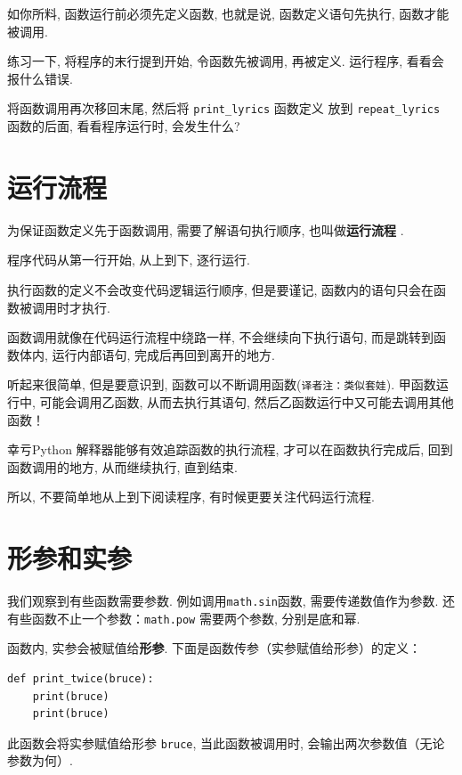 \documentclass[10pt]{book}
\begin{document}
如你所料, 函数运行前必须先定义函数, 也就是说, 
函数定义语句先执行, 函数才能被调用. 

练习一下, 将程序的末行提到开始, 令函数先被调用, 再被定义. 
运行程序, 看看会报什么错误. 

将函数调用再次移回末尾, 然后将 \verb"print_lyrics" 函数定义
放到 \verb"repeat_lyrics" 函数的后面, 看看程序运行时, 会发生什么?

\section{运行流程}

为保证函数定义先于函数调用, 需要了解语句执行顺序, 
也叫做{\bf 运行流程 }. 

程序代码从第一行开始, 从上到下, 逐行运行. 

执行函数的定义不会改变代码逻辑运行顺序, 
但是要谨记, 函数内的语句只会在函数被调用时才执行. 

函数调用就像在代码运行流程中绕路一样, 不会继续向下执行语句, 
而是跳转到函数体内, 运行内部语句, 完成后再回到离开的地方. 

听起来很简单, 但是要意识到, 函数可以不断调用函数({\tt 译者注：类似套娃}).
甲函数运行中, 可能会调用乙函数, 从而去执行其语句, 
然后乙函数运行中又可能去调用其他函数！

幸亏Python 解释器能够有效追踪函数的执行流程, 才可以在函数执行完成后, 
回到函数调用的地方, 从而继续执行, 直到结束. 

所以, 不要简单地从上到下阅读程序, 
有时候更要关注代码运行流程. 


\section{形参和实参}
\label{parameters}

我们观察到有些函数需要参数. 例如调用{\tt math.sin}函数, 需要传递数值作为参数. 
还有些函数不止一个参数：{\tt math.pow} 需要两个参数, 分别是底和幂. 

函数内, 实参会被赋值给{\bf 形参}. 
下面是函数传参（实参赋值给形参）的定义：

\begin{verbatim}
def print_twice(bruce):
    print(bruce)
    print(bruce)
\end{verbatim}
%
此函数会将实参赋值给形参 {\tt bruce}, 当此函数被调用时, 
会输出两次参数值（无论参数为何）. 
\end{document}
